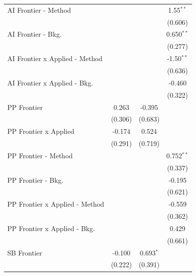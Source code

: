 \begin{tabular}{lccc}
   AI Frontier - Method           &              &              & 1.55$^{**}$\\   
                                  &              &              & (0.606)\\   
   AI Frontier - Bkg.             &              &              & 0.650$^{**}$\\   
                                  &              &              & (0.277)\\   
   AI Frontier x Applied - Method &              &              & -1.50$^{**}$\\   
                                  &              &              & (0.636)\\   
   AI Frontier x Applied - Bkg.   &              &              & -0.460\\   
                                  &              &              & (0.322)\\   
   PP Frontier                    & 0.263        & -0.395       &   \\   
                                  & (0.306)      & (0.683)      &   \\   
   PP Frontier x Applied          & -0.174       & 0.524        &   \\   
                                  & (0.291)      & (0.719)      &   \\   
   PP Frontier - Method           &              &              & 0.752$^{**}$\\   
                                  &              &              & (0.337)\\   
   PP Frontier - Bkg.             &              &              & -0.195\\   
                                  &              &              & (0.621)\\   
   PP Frontier x Applied - Method &              &              & -0.559\\   
                                  &              &              & (0.362)\\   
   PP Frontier x Applied - Bkg.   &              &              & 0.429\\   
                                  &              &              & (0.661)\\   
   SB Frontier                    & -0.100       & 0.693$^{*}$  &   \\   
                                  & (0.222)      & (0.391)      &   \\   

\end{tabular}
